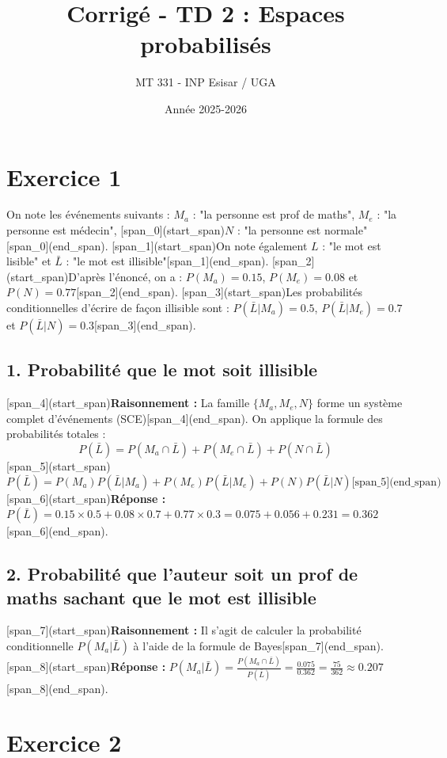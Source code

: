 \documentclass[11pt,a4paper]{article}
\title{Corrigé - TD 2 : Espaces probabilisés}
\author{MT 331 - INP Esisar / UGA}
\date{Année 2025-2026}
\begin{document}
\maketitle

\section*{Exercice 1}
On note les événements suivants : 
$M_a$ : "la personne est prof de maths", 
$M_e$ : "la personne est médecin", 
[span_0](start_span)$N$ : "la personne est normale"[span_0](end_span). 
[span_1](start_span)On note également $L$ : "le mot est lisible" et $\bar{L}$ : "le mot est illisible"[span_1](end_span).
[span_2](start_span)D'après l'énoncé, on a : $P(M_a) = 0.15$, $P(M_e) = 0.08$ et $P(N) = 0.77$[span_2](end_span). 
[span_3](start_span)Les probabilités conditionnelles d'écrire de façon illisible sont : $P(\bar{L}|M_a) = 0.5$, $P(\bar{L}|M_e) = 0.7$ et $P(\bar{L}|N) = 0.3$[span_3](end_span).

\subsection*{1. Probabilité que le mot soit illisible}
[span_4](start_span)\textbf{Raisonnement :} La famille $\{M_a, M_e, N\}$ forme un système complet d'événements (SCE)[span_4](end_span). On applique la formule des probabilités totales :
$$P(\bar{L}) = P(M_a \cap \bar{L}) + P(M_e \cap \bar{L}) + P(N \cap \bar{L})$$
[span_5](start_span)$$P(\bar{L}) = P(M_a)P(\bar{L}|M_a) + P(M_e)P(\bar{L}|M_e) + P(N)P(\bar{L}|N) \text{[span_5](end_span)}$$
[span_6](start_span)\textbf{Réponse :} $P(\bar{L}) = 0.15 \times 0.5 + 0.08 \times 0.7 + 0.77 \times 0.3 = 0.075 + 0.056 + 0.231 = 0.362$[span_6](end_span).

\subsection*{2. Probabilité que l'auteur soit un prof de maths sachant que le mot est illisible}
[span_7](start_span)\textbf{Raisonnement :} Il s'agit de calculer la probabilité conditionnelle $P(M_a|\bar{L})$ à l'aide de la formule de Bayes[span_7](end_span).
[span_8](start_span)\textbf{Réponse :} $P(M_a|\bar{L}) = \frac{P(M_a \cap \bar{L})}{P(\bar{L})} = \frac{0.075}{0.362} = \frac{75}{362} \approx 0.207$[span_8](end_span).

\hrulefill

\section*{Exercice 2}
\end{document}
